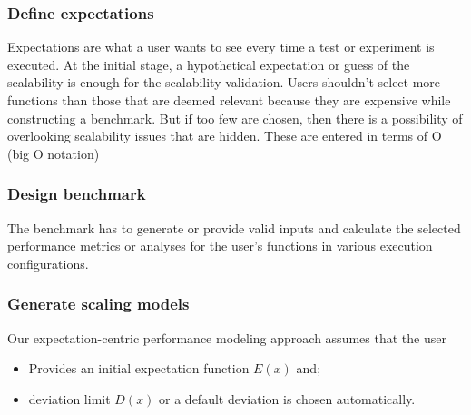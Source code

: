 \documentclass[journal, onecolumn]{IEEEtran}
\begin{document}
	\subsubsection{Define expectations}
	
	Expectations are what a user wants to see every time a test or experiment is executed. At the initial stage, a hypothetical expectation or guess of the scalability is enough for the scalability validation. Users shouldn’t select more functions than those that are deemed relevant because they are expensive while constructing a benchmark. But if too few are chosen, then there is a possibility of overlooking scalability issues that are hidden. These are entered in terms of O (big O notation)
	\newline \newline
	\subsubsection{Design benchmark}
	
	The benchmark has to generate or provide valid inputs and calculate the selected performance metrics or analyses for the user's functions in various execution configurations.
	\newline \newline
	\subsubsection{Generate scaling models}
	
	Our expectation-centric performance modeling approach assumes that the user
	\begin{itemize}
		\item Provides an initial expectation function $E(x)$ and;
		\item deviation limit $D(x)$ or a default deviation is chosen automatically.
	\end{itemize}
	
\end{document}
